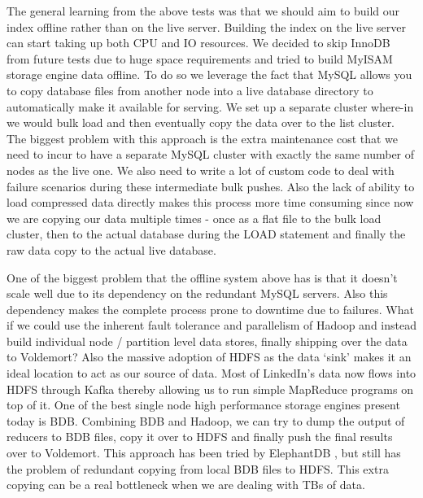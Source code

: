 \documentclass[10pt,twocolumn,preprint,natbib,authoryear]{sigplanconf}
\begin{document}
The general learning from the above tests was that we should aim to build our index offline rather than on the live server. Building the index on the live server can start taking up both CPU and IO resources. We decided to skip InnoDB from future tests due to huge space requirements and tried to build MyISAM storage engine data offline. To do so we leverage the fact that MySQL allows you to copy database files from another node into a live database directory to automatically make it available for serving. We set up a separate cluster where-in we would bulk load and then eventually copy the data over to the list cluster. The biggest problem with this approach is the extra maintenance cost that we need to incur to have a separate MySQL cluster with exactly the same number of nodes as the live one. We also need to write a lot of custom code to deal with failure scenarios during these intermediate bulk pushes. Also the lack of ability to load compressed data directly makes this process more time consuming since now we are copying our data multiple times - once as a flat file to the bulk load cluster, then to the actual database during the LOAD statement and finally the raw data copy to the actual live database. 

One of the biggest problem that the offline system above has is that it doesn't scale well due to its dependency on the redundant MySQL servers. Also this dependency makes the complete process prone to downtime due to failures. What if we could use the inherent fault tolerance and parallelism of Hadoop and instead build individual node / partition level data stores, finally shipping over the data to Voldemort? Also the massive adoption of HDFS as the data `sink' makes it an ideal location to act as our source of data. Most of LinkedIn's data now flows into HDFS through Kafka thereby allowing us to run simple MapReduce programs on top of it. One of the best single node high performance storage engines present today is BDB. Combining BDB and Hadoop, we can try to dump the output of reducers to BDB files, copy it over to HDFS and finally push the final results over to Voldemort. This approach has been tried by ElephantDB \cite{ElephantDB}, but still has the problem of redundant copying from local BDB files to HDFS. This extra copying can be a real bottleneck when we are dealing with TBs of data. 
\end{document}
